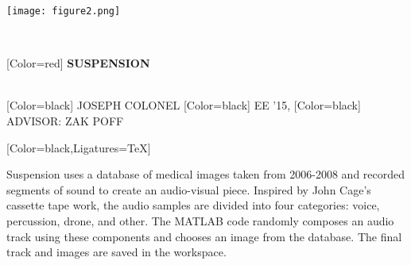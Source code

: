 \documentclass{article}
\begin{document}
\begin{minipage}{\textwidth}
\centering
\texttt{[image: figure2.png]}
\end{minipage}
\vspace{0.8in}\\
\begin{minipage}[c]{20in}
{ 
[Color=red]
\fontsize{3.3in}{0.5in}\selectfont 
\bfseries
SUSPENSION
}
\end{minipage}
\vspace{0.5in}\\
{
[Color=black]
\fontsize{1in}{1em}\selectfont 
JOSEPH COLONEL 
}
{
[Color=black]
\fontsize{0.8in}{1em}\selectfont 
EE '15,
}
{
[Color=black]
\fontsize{0.8in}{1em}\selectfont 
\noindent ADVISOR: ZAK POFF
}
\vspace{0.5in}\\
\begin{minipage}{13.4in}
{
	[Color=black,Ligatures=TeX]
	\fontsize{0.65in}{6em}\selectfont

Suspension uses a database of medical images taken from 2006-2008 and recorded
segments of sound to create an audio-visual piece. Inspired by John Cage’s
cassette tape work, the audio samples are divided into four categories: voice,
percussion, drone, and other. The MATLAB code randomly composes an audio track
using these components and chooses an image from the database. The final track
and images are saved in the workspace.  

} 
\end{minipage}
   
\end{document}
